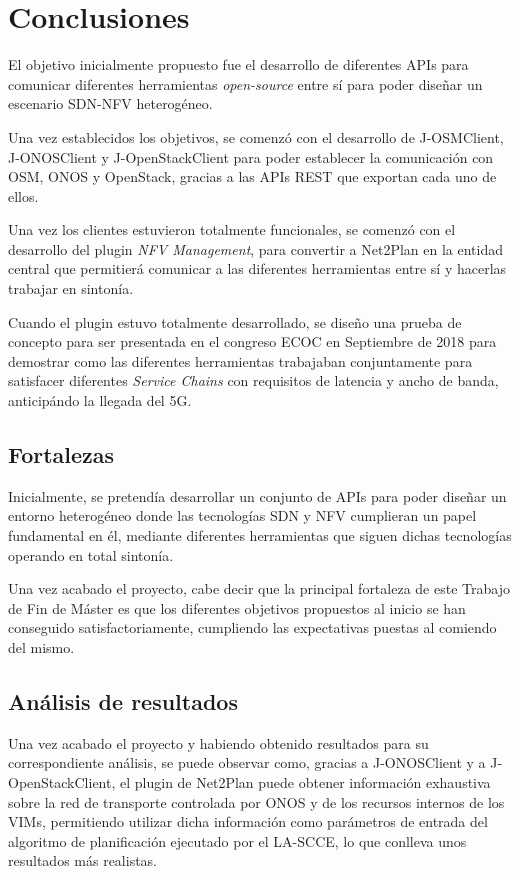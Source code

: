 \chapter{Conclusiones}
\label{conclusiones}

El objetivo inicialmente propuesto fue el desarrollo de diferentes \acp{API} para comunicar diferentes herramientas \textit{open-source} entre sí para poder diseñar un escenario \ac{SDN}-\ac{NFV} heterogéneo.

Una vez establecidos los objetivos, se comenzó con el desarrollo de J-OSMClient, J-ONOSClient y J-OpenStackClient para poder establecer la comunicación con \ac{OSM}, \ac{ONOS} y OpenStack, gracias a las \acp{API} \ac{REST} que exportan cada uno de ellos.

Una vez los clientes estuvieron totalmente funcionales, se comenzó con el desarrollo del plugin \textit{NFV Management}, para convertir a Net2Plan en la entidad central que permitierá comunicar a las diferentes herramientas entre sí y hacerlas trabajar en sintonía.

Cuando el plugin estuvo totalmente desarrollado, se diseño una prueba de concepto para ser presentada en el congreso \ac{ECOC} en Septiembre de 2018 para demostrar como las diferentes herramientas trabajaban conjuntamente para satisfacer diferentes \textit{Service Chains} con requisitos de latencia y ancho de banda, anticipándo la llegada del 5G.


\section{Fortalezas}

Inicialmente, se pretendía desarrollar un conjunto de \acp{API} para poder diseñar un entorno heterogéneo donde las tecnologías \ac{SDN} y \ac{NFV} cumplieran un papel fundamental en él, mediante diferentes herramientas que siguen dichas tecnologías operando en total sintonía.

Una vez acabado el proyecto, cabe decir que la principal fortaleza de este Trabajo de Fin de Máster es que los diferentes objetivos propuestos al inicio se han conseguido satisfactoriamente, cumpliendo las expectativas puestas al comiendo del mismo.

\section{Análisis de resultados}

Una vez acabado el proyecto y habiendo obtenido resultados para su correspondiente análisis, se puede observar como, gracias a J-ONOSClient y a J-OpenStackClient, el plugin de Net2Plan puede obtener información exhaustiva sobre la red de transporte controlada por \ac{ONOS} y de los recursos internos de los \acp{VIM}, permitiendo utilizar dicha información como parámetros de entrada del algoritmo de planificación ejecutado por el \ac{LA-SCCE}, lo que conlleva unos resultados más realistas.

